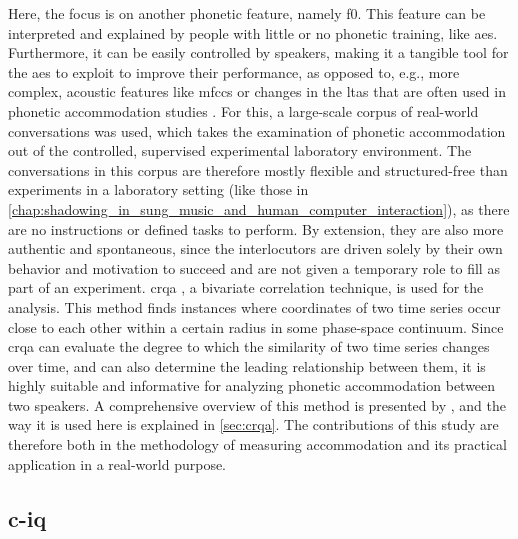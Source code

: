 Here, the focus is on another phonetic feature, namely \ac{f0}.
This feature can be interpreted and explained by people with little or no phonetic training, like \acp{ae}.
Furthermore, it can be easily controlled by speakers, making it a tangible tool for the \acp{ae} to exploit to improve their performance, as opposed to, e.g., more complex, acoustic features like \acp{mfcc} or changes in the \ac{ltas} that are often used in phonetic accommodation studies \citep{Levitan2011measuring, Borrie2019syncing}.
For this, a large-scale corpus of real-world conversations was used, which takes the examination of phonetic accommodation out of the controlled, supervised experimental laboratory environment.
The conversations in this corpus are therefore mostly flexible and structured-free than experiments in a laboratory setting (like those in \cref{chap:shadowing_in_sung_music_and_human_computer_interaction}), as there are no instructions or defined tasks to perform.
By extension, they are also more authentic and spontaneous, since the interlocutors are driven solely by their own behavior and motivation to succeed and are not given a temporary role to fill as part of an experiment.
\Ac{crqa} \citep{Zbilut1998detecting}, a bivariate correlation technique, is used for the analysis.
This method finds instances where coordinates of two time series occur close to each other within a certain radius in some phase-space continuum.
Since \ac{crqa} can evaluate the degree to which the similarity of two time series changes over time, and can also determine the leading relationship between them, it is highly suitable and informative for analyzing phonetic accommodation between two speakers.
A comprehensive overview of this method is presented by \citet{Wallot2018analyzing}, and the way it is used here is explained in \cref{sec:crqa}.
The contributions of this study are therefore both in the methodology of measuring accommodation and its practical application in a real-world purpose.

\subsection{\Acl{c-iq}}
\label{subsec:conversation_intelligence}

